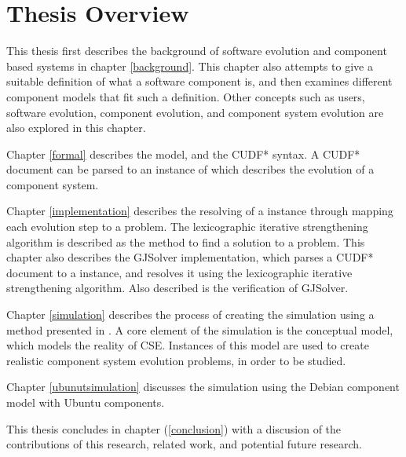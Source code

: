 \section{Thesis Overview}
This thesis first describes the background of software evolution and component based systems in chapter \ref{background}.
This chapter also attempts to give a suitable definition of what a software component is, and then examines different component models that fit such a definition.
Other concepts such as users, software evolution, component evolution, and component system evolution are also explored in this chapter.

Chapter \ref{formal} describes the \modelname model, and the CUDF* syntax.
A CUDF* document can be parsed to an instance of \modelname which describes the evolution of a component system.

Chapter \ref{implementation} describes the resolving of a \modelname instance through mapping each evolution step to a \modelimpl problem.
The lexicographic iterative strengthening algorithm is described as the method to find a solution to a \modelimpl problem.
This chapter also describes the GJSolver implementation, which parses a CUDF* document to a \modelname instance, and resolves it using the lexicographic iterative strengthening algorithm.
Also described is the verification of GJSolver.

Chapter \ref{simulation} describes the process of creating the simulation using a method presented in \citep{Law2005}.
A core element of the simulation is the conceptual model, which models the reality of CSE.
Instances of this model are used to create realistic component system evolution problems, in order to be studied.

Chapter \ref{ubunutsimulation} discusses the simulation using the Debian component model \citep{Barth2005} with Ubuntu \citep{Hill2006} components. 

This thesis concludes in chapter (\ref{conclusion}) with a discusion of the contributions of this research, related work, and potential future research.